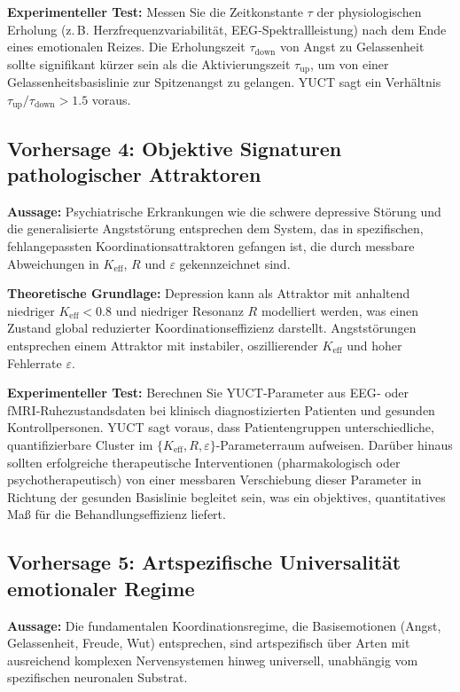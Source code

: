 \documentclass[12pt,a4paper]{article}
\begin{document}
	\textbf{Experimenteller Test:} Messen Sie die Zeitkonstante \(\tau\) der physiologischen Erholung (z. B. Herzfrequenzvariabilität, EEG‑Spektrallleistung) nach dem Ende eines emotionalen Reizes. Die Erholungszeit \(\tau_{\text{down}}\) von Angst zu Gelassenheit sollte signifikant kürzer sein als die Aktivierungszeit \(\tau_{\text{up}}\), um von einer Gelassenheitsbasislinie zur Spitzenangst zu gelangen. YUCT sagt ein Verhältnis \(\tau_{\text{up}}/\tau_{\text{down}} > 1.5\) voraus.
	
	\subsection{Vorhersage 4: Objektive Signaturen pathologischer Attraktoren}
	
	\textbf{Aussage:} Psychiatrische Erkrankungen wie die schwere depressive Störung und die generalisierte Angststörung entsprechen dem System, das in spezifischen, fehlangepassten Koordinationsattraktoren gefangen ist, die durch messbare Abweichungen in \(K_{\mathrm{eff}}\), \(R\) und \(\varepsilon\) gekennzeichnet sind.
	
	\textbf{Theoretische Grundlage:} Depression kann als Attraktor mit anhaltend niedriger \(K_{\mathrm{eff}} < 0.8\) und niedriger Resonanz \(R\) modelliert werden, was einen Zustand global reduzierter Koordinationseffizienz darstellt. Angststörungen entsprechen einem Attraktor mit instabiler, oszillierender \(K_{\mathrm{eff}}\) und hoher Fehlerrate \(\varepsilon\).
	
	\textbf{Experimenteller Test:} Berechnen Sie YUCT‑Parameter aus EEG‑ oder fMRI‑Ruhezustandsdaten bei klinisch diagnostizierten Patienten und gesunden Kontrollpersonen. YUCT sagt voraus, dass Patientengruppen unterschiedliche, quantifizierbare Cluster im \(\{K_{\mathrm{eff}}, R, \varepsilon\}\)-Parameterraum aufweisen. Darüber hinaus sollten erfolgreiche therapeutische Interventionen (pharmakologisch oder psychotherapeutisch) von einer messbaren Verschiebung dieser Parameter in Richtung der gesunden Basislinie begleitet sein, was ein objektives, quantitatives Maß für die Behandlungseffizienz liefert.
	
	\subsection{Vorhersage 5: Artspezifische Universalität emotionaler Regime}
	
	\textbf{Aussage:} Die fundamentalen Koordinationsregime, die Basisemotionen (Angst, Gelassenheit, Freude, Wut) entsprechen, sind artspezifisch über Arten mit ausreichend komplexen Nervensystemen hinweg universell, unabhängig vom spezifischen neuronalen Substrat.
	
\end{document}
